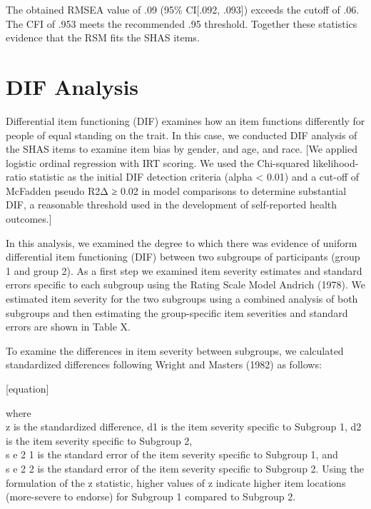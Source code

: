 \documentclass[
  letterpaper,
]{article}
\begin{document}
The obtained RMSEA value of .09 (95\% CI{[}.092, .093{]}) exceeds the
cutoff of .06. The CFI of .953 meets the recommended .95 threshold.
Together these statistics evidence that the RSM fits the SHAS items.

\section*{DIF Analysis}\label{dif-analysis}


Differential item functioning (DIF) examines how an item functions
differently for people of equal standing on the trait. In this case, we
conducted DIF analysis of the SHAS items to examine item bias by gender,
and age, and race. {[}We applied logistic ordinal regression with IRT
scoring. We used the Chi-squared likelihood-ratio statistic as the
initial DIF detection criteria (alpha \textless{} 0.01) and a cut-off of
McFadden pseudo R2Δ ≥ 0.02 in model comparisons to determine substantial
DIF, a reasonable threshold used in the development of self-reported
health outcomes.{]}

In this analysis, we examined the degree to which there was evidence of
uniform differential item functioning (DIF) between two subgroups of
participants (group 1 and group 2). As a first step we examined item
severity estimates and standard errors specific to each subgroup using
the Rating Scale Model Andrich (1978). We estimated item severity for
the two subgroups using a combined analysis of both subgroups and then
estimating the group-specific item severities and standard errors are
shown in Table X.

To examine the differences in item severity between subgroups, we
calculated standardized differences following Wright and Masters (1982)
as follows:

{[}equation{]}

where\\
z is the standardized difference, d1 is the item severity specific to
Subgroup 1, d2 is the item severity specific to Subgroup 2,\\
s e 2 1 is the standard error of the item severity specific to Subgroup
1, and\\
s e 2 2 is the standard error of the item severity specific to Subgroup
2. Using the formulation of the z statistic, higher values of z indicate
higher item locations (more-severe to endorse) for Subgroup 1 compared
to Subgroup 2.
\end{document}
